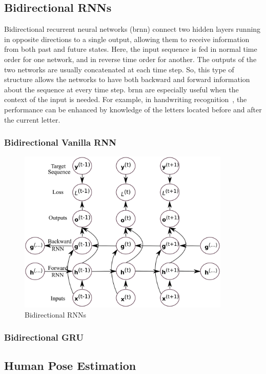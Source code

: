 \subsection{Bidirectional RNNs}
Bidirectional recurrent neural networks (\gls{brnn}) connect two hidden layers running in opposite directions to a single output, allowing them to receive information from both past and future states. Here, the input sequence is fed in normal time order for one network, and in reverse time order for another. The outputs of the two networks are usually concatenated at each time step. So, this type of structure allows the networks to have both backward and forward information about the sequence at every time step. \gls{brnn} are especially useful when the context of the input is needed. For example, in handwriting recognition~\cite{Graves_08}, the performance can be enhanced by knowledge of the letters located before and after the current letter. 




\subsubsection{Bidirectional Vanilla RNN}
\begin{figure}
	\centering
	\includegraphics[width=0.9\textwidth]{figures/brnn.eps}
	\caption{Bidirectional RNNs \label{fig:bidirectional_rnn}}
\end{figure}
\subsubsection{Bidirectional GRU}

\subsection{Human Pose Estimation}
